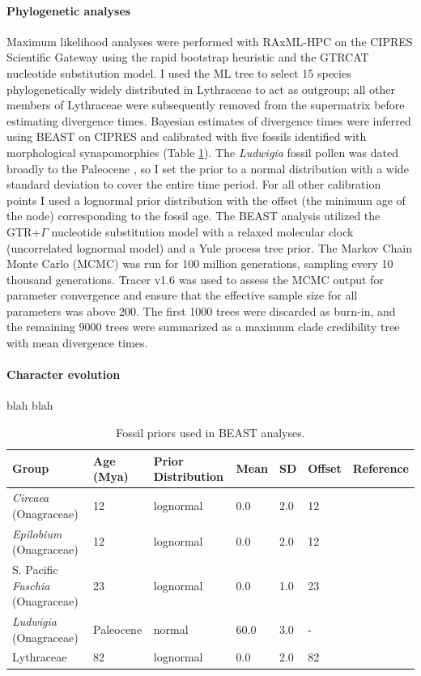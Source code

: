 \documentclass[review]{elsarticle}
\begin{document}
\paragraph{Phylogenetic analyses} 
Maximum likelihood analyses were performed with RAxML-HPC \citep{raxml} on the CIPRES Scientific Gateway \citep{cipres} 
using the rapid bootstrap heuristic and the GTRCAT nucleotide substitution model.
I used the ML tree to select 15 species phylogenetically widely distributed in Lythraceae to act as outgroup; 
all other members of Lythraceae were subsequently removed from the supermatrix before estimating divergence times.
Bayesian estimates of divergence times were inferred using BEAST \citep{beast, beast2} on CIPRES and calibrated with five fossils 
identified with morphological synapomorphies (Table \ref{fossils}).
The \textit{Ludwigia} fossil pollen was dated broadly to the Paleocene \citep{grimsson}, so I set the prior to a normal distribution with a wide 
standard deviation to cover the entire time period.
For all other calibration points I used a lognormal prior distribution with the offset (the minimum age of the node) corresponding to the fossil age.
The BEAST analysis utilized the GTR+$\Gamma$ nucleotide substitution model with a relaxed molecular clock (uncorrelated lognormal model)
and a Yule process tree prior.
The Markov Chain Monte Carlo (MCMC) was run for 100 million generations, sampling every 10 thousand generations.
Tracer v1.6 \citep{tracer} was used to assess the MCMC output for parameter convergence and ensure that the effective sample size for all parameters was above 200.
The first 1000 trees were discarded as burn-in, and the remaining 9000 trees were summarized as a maximum clade credibility tree with mean divergence times. 

\paragraph{Character evolution}
blah blah


\begin{table}
   \begin{adjustbox}{max width=\textwidth}
      \begin{tabular}{lllllll}
         \hline
         Group & Age (Mya) & Prior Distribution & Mean & SD & Offset & Reference \\ \hline
         \textit{Circaea} (Onagraceae) & 12 & lognormal & 0.0 & 2.0 & 12 & \citep{grimsson} \\
         \textit{Epilobium} (Onagraceae) & 12 & lognormal & 0.0 & 2.0 & 12 & \citep{grimsson} \\
         S. Pacific \textit{Fuschia} (Onagraceae) & 23 & lognormal & 0.0 & 1.0 & 23 & \citep{lee2013fossil} \\
         \textit{Ludwigia} (Onagraceae) & Paleocene & normal & 60.0 & 3.0 & - & \citep{zhi} \\
         Lythraceae & 82 & lognormal & 0.0 & 2.0 & 82 & \citep{graham} \\
         \hline
      \end{tabular}
   \end{adjustbox}
   \caption{Fossil priors used in BEAST analyses.}
   \label{fossils}
\end{table}
\end{document}
